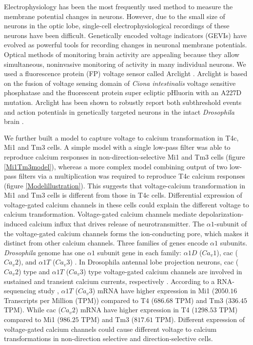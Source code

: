 \documentclass[9pt,lineno]{elife}
\begin{document}
Electrophysiology has been the most frequently used method to measure the membrane potential changes in neurons. However, due to the small size of neurons in the optic lobe, single-cell electrophysiological recordings of these neurons have been difficult. Genetically encoded voltage indicators (GEVIs) have evolved as powerful tools for recording changes in neuronal membrane potentials. Optical methods of monitoring brain activity are appealing because they allow simultaneous, noninvasive monitoring of activity in many individual neurons. We used a fluorescence protein (FP) voltage sensor called Arclight \parencite{Jin2012}. Arclight is based on the fusion of voltage sensing domain of \textit{Ciona intestinalis} voltage sensitive phosphatase \parencite{Murata2005} and the fluorescent protein super ecliptic pHluorin with an A227D mutation. Arclight has been shown to robustly report both subthreshold events and action potentials in genetically targeted neurons in the intact \textit{Drosophila} brain \parencite{Cao2013}. 

We further built a model to capture voltage to calcium transformation in T4c, Mi1 and Tm3 cells. A simple model with a single low-pass filter was able to reproduce calcium responses in non-direction-selective Mi1 and Tm3 cells (figure \ref{Mi1Tm3model}), whereas a more complex model combining output of two low-pass filters via a multiplication was required to reproduce T4c calcium responses (figure \ref{Modelillustration}). This suggests that voltage-calcium transformation in Mi1 and Tm3 cells is different from those in T4c cells. Differential expression of voltage-gated calcium channels in these cells could explain the different voltage to calcium transformation. Voltage-gated calcium channels mediate depolarization-induced calcium influx that drives release of neurotransmitter. The $\alpha1$-subunit of the voltage-gated calcium channels forms the ion-conducting pore, which makes it distinct from other calcium channels. Three families of genes encode $\alpha1$ subunits. \textit{Drosophila} genome has one $\alpha1$ subunit gene in each family: $\alpha1D$ ($Ca_{v}1$), cac ($Ca_{v}2$), and $\alpha1T$ ($Ca_{v}3$) \parencite{Littleton2000, King2007}. In Drosophila antennal lobe projection neurons, cac ($Ca_{v}2$) type and $\alpha1T$ ($Ca_{v}3$) type voltage-gated calcium channels are involved in sustained and transient calcium currents, respectively \parencite{Gu2009, Iniguez2013}. According to a RNA-sequencing study \parencite{Davis2020}, $\alpha1T$ ($Ca_{v}3$) mRNA have higher expression in Mi1 ($2050.16$ Transcripts per Million (TPM)) compared to T4 ($686.68$ TPM) and Tm3 ($336.45$ TPM). While cac ($Ca_{v}2$) mRNA have higher expression in T4 ($1298.53$ TPM) compared to Mi1 ($986.25$ TPM) and Tm3 ($817.61$ TPM). Different expression of voltage-gated calcium channels could cause different voltage to calcium transformations in non-direction selective and direction-selective cells.
\end{document}
